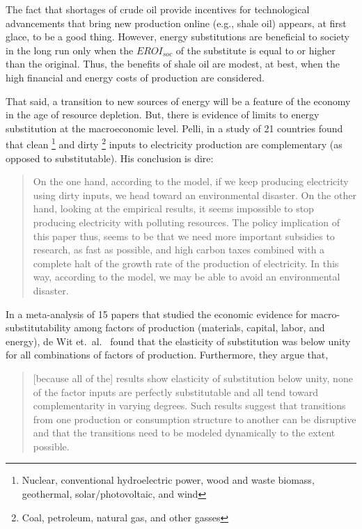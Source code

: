 The fact that shortages of crude oil provide incentives for 
technological advancements that bring new production online (e.g., shale oil)
appears, at first glace, to be a good thing.
However, energy substitutions are beneficial to society 
in the long run only when the $EROI_{soc}$ of the substitute
is equal to or higher than the original.
Thus, the benefits of shale oil are modest, at best, when the
high financial and energy costs of production are considered.

That said, a transition to new sources of energy will be a feature 
of the economy in the age of resource depletion.
But, there is evidence of limits to energy substitution 
at the macroeconomic level.
Pelli, in a study of 21 countries 
found that clean%
	\footnote{
	Nuclear, 
	conventional hydroelectric power, wood and waste biomass, 
	geothermal, solar/photovoltaic, and wind
	}
and dirty%
	\footnote{
	Coal, 
	petroleum, natural gas, and other gasses
	}
inputs to electricity production
are complementary (as opposed to substitutable).\cite{Pelli:2012wv}
His conclusion is dire:
%
\begin{quote}
	On the one hand, according to the model, 
	if we keep producing electricity using dirty inputs, 
	we head toward an environmental disaster. 
	On the other hand, looking at the empirical results, 
	it seems impossible to stop producing electricity with polluting resources. 
	The policy implication of this paper thus, 
	seems to be that we need more important subsidies to research, 
	as fast as possible, 
	and high carbon taxes combined with a complete halt 
	of the growth rate of the production of electricity. 
	In this way, according to the model, 
	we may be able to avoid an environmental disaster.\cite[p.~25]{Pelli:2012wv}
\end{quote}

In a meta-analysis of 15 papers that studied 
the economic evidence for macro-substitutability
among factors of production (materials, capital, labor, and energy), 
de Wit et.\ al.~\cite{de-Wit:2013aa} found that the elasticity of substitution was 
below unity for all combinations of factors of production.
Furthermore, they argue that, 
%
\begin{quote}
	[because all of the] results show elasticity of substitution below unity, 
	none of the factor inputs are perfectly substitutable and 
	all tend toward complementarity in varying degrees. 
	Such results suggest that transitions 
	from one production or consumption structure to another 
	can be disruptive and that the transitions 
	need to be modeled dynamically to the extent possible.\cite[p.~8]{de-Wit:2013aa}
\end{quote}

